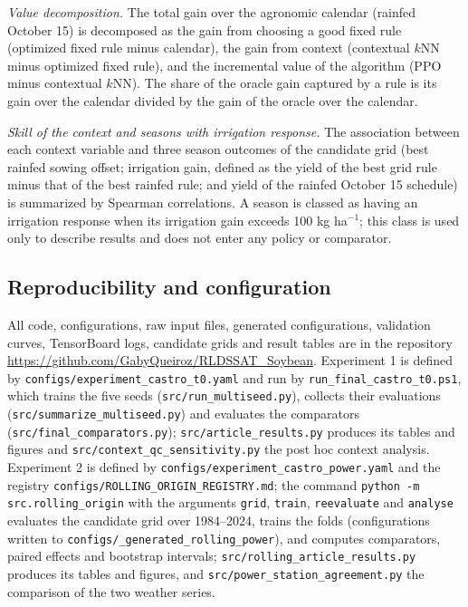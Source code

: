 \documentclass[times,final,authoryear]{elsarticle}
\begin{document}
\emph{Value decomposition.} The total gain over the agronomic calendar (rainfed October 15) is decomposed as the gain from choosing a good fixed rule (optimized fixed rule minus calendar), the gain from context (contextual $k$NN minus optimized fixed rule), and the incremental value of the algorithm (PPO minus contextual $k$NN). The share of the oracle gain captured by a rule is its gain over the calendar divided by the gain of the oracle over the calendar.

\emph{Skill of the context and seasons with irrigation response.} The association between each context variable and three season outcomes of the candidate grid (best rainfed sowing offset; irrigation gain, defined as the yield of the best grid rule minus that of the best rainfed rule; and yield of the rainfed October 15 schedule) is summarized by Spearman correlations. A season is classed as having an irrigation response when its irrigation gain exceeds 100 kg ha$^{-1}$; this class is used only to describe results and does not enter any policy or comparator.

\subsection{Reproducibility and configuration}
\label{subrepro}

All code, configurations, raw input files, generated configurations, validation curves, TensorBoard logs, candidate grids and result tables are in the repository \url{https://github.com/GabyQueiroz/RLDSSAT_Soybean}. Experiment 1 is defined by \texttt{configs/experiment\_castro\_t0.yaml} and run by \texttt{run\_final\_castro\_t0.ps1}, which trains the five seeds (\texttt{src/run\_multiseed.py}), collects their evaluations (\texttt{src/summarize\_multiseed.py}) and evaluates the comparators (\texttt{src/final\_comparators.py}); \texttt{src/article\_results.py} produces its tables and figures and \texttt{src/context\_qc\_sensitivity.py} the post hoc context analysis. Experiment 2 is defined by \texttt{configs/experiment\_castro\_power.yaml} and the registry \texttt{configs/ROLLING\_ORIGIN\_REGISTRY.md}; the command \texttt{python -m src.rolling\_origin} with the arguments \texttt{grid}, \texttt{train}, \texttt{reevaluate} and \texttt{analyse} evaluates the candidate grid over 1984--2024, trains the folds (configurations written to \texttt{configs/\_generated\_rolling\_power}), and computes comparators, paired effects and bootstrap intervals; \texttt{src/rolling\_article\_results.py} produces its tables and figures, and \texttt{src/power\_station\_agreement.py} the comparison of the two weather series.
\end{document}
